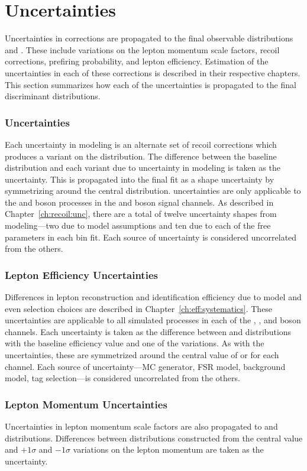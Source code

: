 \section{Uncertainties}\label{ch:unc}
Uncertainties in corrections are propagated to the final observable distributions \mt and \mll. These include variations on the lepton momentum scale factors, recoil corrections, prefiring probability, and lepton efficiency. Estimation of the uncertainties in each of these corrections is described in their respective chapters. This section summarizes how each of the uncertainties is propagated to the final discriminant distributions.
\subsubsection{\met Uncertainties}
Each uncertainty in \met modeling is an alternate set of recoil corrections which produces a variant on the \mt distribution. The difference between the baseline \mt distribution and each variant due to uncertainty in \met modeling is taken as the uncertainty. This is propagated into the final fit as a shape uncertainty by symmetrizing around the central \mt distribution. \met uncertainties are only applicable to the \W and \Z boson processes in the \Wp and \Wm boson signal channels. As described in Chapter~\ref{ch:recoil:unc}, there are a total of twelve uncertainty shapes from \met modeling---two due to model assumptions and ten due to each of the free parameters in each \pt bin fit. Each source of uncertainty is considered uncorrelated from the others.

\subsubsection{Lepton Efficiency Uncertainties}
Differences in lepton reconstruction and identification efficiency due to model and even selection choices are described in Chapter~\ref{ch:eff:systematics}. These uncertainties are applicable to all simulated processes in each of the \Wp, \Wm, and \Z boson channels. Each uncertainty is taken as the difference between \mll and \mt distributions with the baseline efficiency value and one of the variations. As with the \met uncertainties, these are symmetrized around the central value of \mll or \mt for each channel. Each source of uncertainty---MC generator, FSR model, background model, tag selection---is considered uncorrelated from the others.

\subsubsection{Lepton Momentum Uncertainties}
Uncertainties in lepton momentum scale factors are also propagated to \mll and \mt distributions. Differences between distributions constructed from the central value and $+1\sigma$ and $-1\sigma$ variations on the lepton momentum are taken as the uncertainty. 

